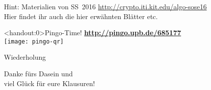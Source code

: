 

\def\haslogo{}



\date{28. Juli \thisyear}



	
	
	\begin{frame}
		\titlepage
	\end{frame}
	
\begin{frame}{Hint: Materialien von SS~2016}
	\centering 
	\Large
	\url{http://crypto.iti.kit.edu/algo-sose16} \\
	\bigskip
	\normalsize Hier findet ihr auch die hier erwähnten Blätter etc.
\end{frame}
	
\begin{frame}<handout:0>{Pingo-Time! \smiley}
	\centering
	\textbf{\large \url{http://pingo.upb.de/685177}} \\
	\texttt{[image: pingo-qr]}
\end{frame}
	
\begin{headframe}
	Wiederholung
\end{headframe}





	
\begin{headframe}
	Danke fürs Dasein und \\
	viel Glück für eure Klausuren! \smiley 
\end{headframe}
	

